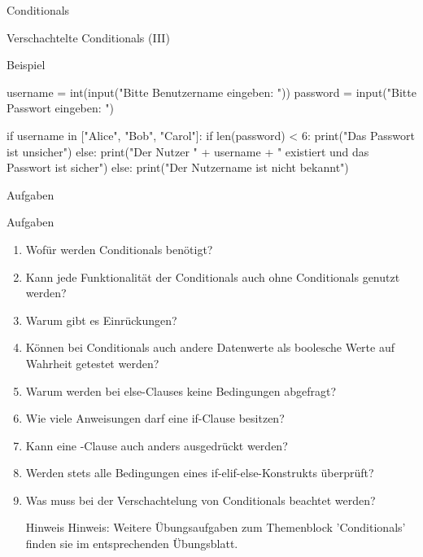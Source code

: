 \begin{subsection}{Conditionals}
          \begin{frame}[fragile]{Verschachtelte Conditionals (III)}
            \begin{exampleblock}{Beispiel}
\begin{pythoncode}
username = int(input("Bitte Benutzername eingeben: "))
password = input("Bitte Passwort eingeben: ")

if username in  ["Alice", "Bob", "Carol"]:
    if len(password) < 6:
        print("Das Passwort ist unsicher")
    else:
        print("Der Nutzer " + username + " existiert und das Passwort ist sicher")
else:
    print("Der Nutzername ist nicht bekannt")
\end{pythoncode}
            \end{exampleblock}
        \end{frame}
        
    
    \begin{subsubsection}{Aufgaben}
        \begin{frame}{Aufgaben}
            \begin{enumerate}
                \item Wofür werden Conditionals benötigt?
                \item Kann jede Funktionalität der Conditionals auch ohne Conditionals genutzt werden?
                \item Warum gibt es Einrückungen?
                \item Können bei Conditionals auch andere Datenwerte als boolesche Werte auf Wahrheit getestet werden?
                \item Warum werden bei else-Clauses keine Bedingungen abgefragt?
                \item Wie viele Anweisungen darf eine if-Clause besitzen?
                \item Kann eine -Clause auch anders ausgedrückt werden?
                \item Werden stets alle Bedingungen eines if-elif-else-Konstrukts überprüft?
                \item Was muss bei der Verschachtelung von Conditionals beachtet werden?
                
               \begin{block}{Hinweis}
                Hinweis: Weitere Übungsaufgaben zum Themenblock 'Conditionals' finden sie im entsprechenden Übungsblatt.
            \end{block}
            
            \end{enumerate}
        \end{frame}
    \end{subsubsection}
    \end{subsection}
    
